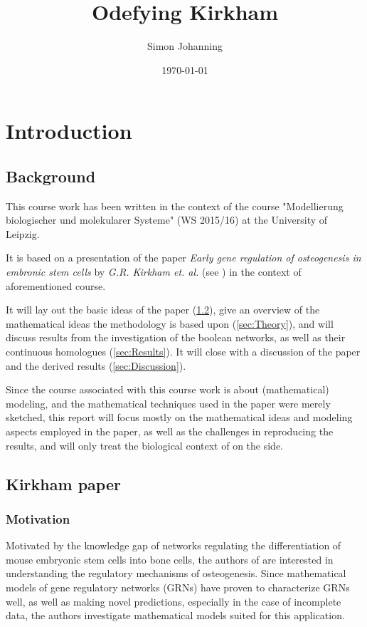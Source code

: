 \documentclass[11pt]{article}
\begin{document}
\title{Odefying Kirkham}
\author{Simon Johanning}
\date{\today}
\maketitle

\tableofcontents

\section{Introduction} \label{sec:Intro}
\subsection{Background}
This course work has been written in the context of the course "Modellierung biologischer und molekularer Systeme" (WS 2015/16) at the University of Leipzig.

It is based on a presentation of the paper \textit{Early gene regulation of osteogenesis in embronic stem cells} by \textit{G.R. Kirkham et. al.} (see \cite{Kirkham}) in the context of aforementioned course.

It will lay out the basic ideas of the paper (\ref{ssec:Kirkham}), give an overview of the mathematical ideas the methodology is based upon (\ref{sec:Theory}), and will discuss results from the investigation of the boolean networks, as well as their continuous homologues (\ref{sec:Results}). It will close with a discussion of the paper and the derived results (\ref{sec:Discussion}).

Since the course associated with this course work is about (mathematical) modeling, and the mathematical techniques used in the paper were merely sketched, this report will focus mostly on the mathematical ideas and modeling aspects employed in the paper, as well as the challenges in reproducing the results, and will only treat the biological context of \cite{Kirkham} on the side.
\subsection{Kirkham paper} \label{ssec:Kirkham}
\subsubsection{Motivation} \label{sssec:Motivationkirkham}
Motivated by the knowledge gap of networks regulating the differentiation of mouse embryonic stem cells into bone cells, the authors of \cite{Kirkham} are interested in understanding the regulatory mechanisms of osteogenesis.
Since mathematical models of gene regulatory networks (GRNs) have proven to characterize GRNs well, as well as making novel predictions, especially in the case of incomplete data, the authors investigate mathematical models suited for this application.
\end{document}
